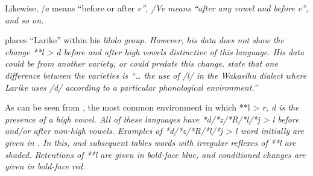 \begin{table}
\begin{threeparttable}
\begin{tablenotes}
{								Likewise, /e means “before or after \it{e}”,
								/V{\gap}e means “after any vowel
								and before \it{e}”, and so on.}
			\item[‡] {\citet[24]{Stresemann1927} places “Larike” within his \it{lilolo} group.
								However, his data does not show the change **l > \it{d} before
								and after high vowels distinctive of this language.
								His data could be from another variety,
								or could predate this change.
								\citet[1]{LaidigLaidig1991} state that one difference between
								the varieties is “{\ldots} the use of /l/ in the Wakasihu dialect
								where Larike uses /d/ according to a particular phonological
								environment.”}
		\end{tablenotes}
	\end{threeparttable}
\end{table}

\newpage
As can be seen from ,
the most common environment in which **l > \it{r,
d} is the presence of a high vowel.
All of these languages have *d/*z/*R/*l/*j > \it{l} before and/or after non-high vowels.
Examples of *d/*z/*R/*l/*j > \it{l} word initially are given in .
In this, and subsequent tables words with irregular reflexes
of **l are shaded.
Retentions of **l are given in bold-face blue,
and conditioned changes are given in bold-face red.

